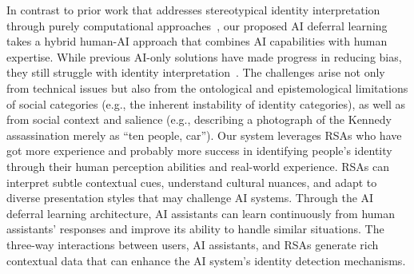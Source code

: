 {In contrast to prior work that addresses stereotypical identity interpretation through purely computational approaches~\cite{wang2019balanced,wang2020towards,ramaswamy2021fair}, our proposed AI deferral learning takes a hybrid human-AI approach that combines AI capabilities with human expertise. 
% 
While previous AI-only solutions have made progress in reducing bias, they still struggle with identity interpretation~\cite{hanley2021computer}.
The challenges arise not only from technical issues but also from the ontological and epistemological limitations of social categories (e.g., the inherent instability of identity categories), as well as from social context and salience (e.g., describing a photograph of the Kennedy assassination merely as ``ten people, car'').
%
Our system leverages RSAs who have got more experience and probably more success in identifying people's identity through their human perception abilities and real-world experience. 
RSAs can interpret subtle contextual cues, understand cultural nuances, and adapt to diverse presentation styles that may challenge AI systems. 
Through the AI deferral learning architecture, AI assistants can learn continuously from human assistants' responses and improve its ability to handle similar situations. The three-way interactions between users, AI assistants, and RSAs generate rich contextual data that can enhance the AI system's identity detection mechanisms.} 






